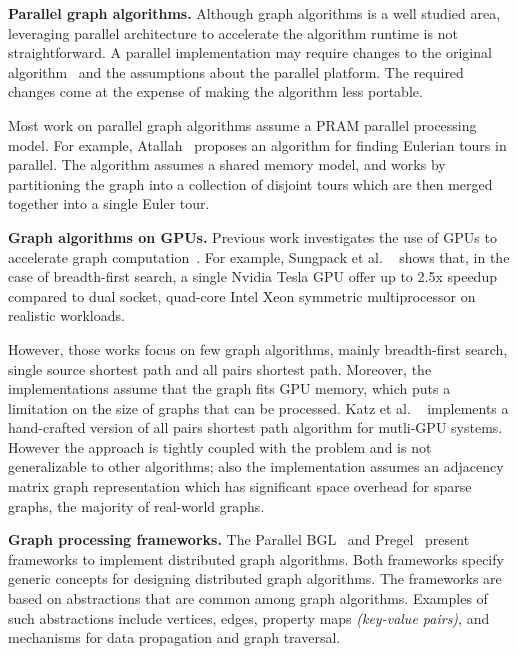 \documentclass{acm_proc_article-sp}[12pt]
\begin{document}
{\bf Parallel graph algorithms.} Although graph algorithms is a well studied area, leveraging parallel architecture to accelerate the algorithm runtime is not straightforward. A parallel implementation may require changes to the original algorithm~\cite{Quinn1984,Atallah1984} and the assumptions about the parallel platform. The required changes come at the expense of making the algorithm less portable.

Most work on parallel graph algorithms assume a PRAM parallel processing model.  For example, Atallah~\cite{Atallah1984} proposes an algorithm for finding Eulerian tours in parallel. The algorithm assumes a shared memory model, and works by partitioning the graph into a collection of disjoint tours which are then merged together into a single Euler tour.

{\bf Graph algorithms on GPUs.} Previous work investigates the use of GPUs to accelerate graph computation~\cite{Harish2007, Katz2008, Sungpack2010, dehne2010exploring}. For example, Sungpack et al. ~\cite{Sungpack2010} shows that, in the case of breadth-first search, a single Nvidia Tesla GPU offer up to 2.5x speedup compared to dual socket, quad-core Intel Xeon symmetric multiprocessor on realistic workloads.

However, those works focus on few graph algorithms, mainly breadth-first search, single source shortest path and all pairs shortest path. Moreover, the implementations assume that the graph fits GPU memory, which puts a limitation on the size of graphs that can be processed. Katz et al. ~\cite{Katz2008} implements a hand-crafted version of all pairs shortest path algorithm for mutli-GPU systems. However the approach is tightly coupled with the problem and is not generalizable to other algorithms; also the implementation assumes an adjacency matrix graph representation which has significant space overhead for sparse graphs, the majority of real-world graphs.

{\bf Graph processing frameworks.} The Parallel BGL~\cite{gregor2005parallel} and Pregel~\cite{Malewicz2009} present frameworks to implement distributed graph algorithms. Both frameworks specify generic concepts for designing distributed graph algorithms. The frameworks are based on abstractions that are common among graph algorithms. Examples of such abstractions include vertices, edges, property maps {\em (key-value pairs)}, and mechanisms for data propagation and graph traversal. 
\end{document}
